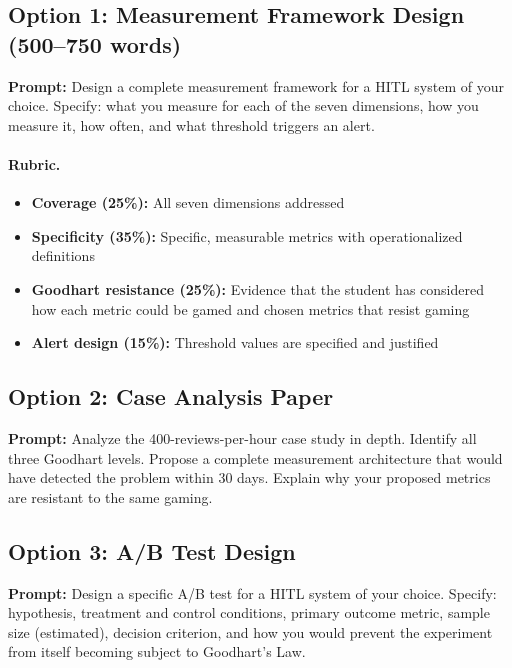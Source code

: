 \subsection{Option 1: Measurement Framework Design (500--750 words)}

\textbf{Prompt:} Design a complete measurement framework for a HITL system of your choice. Specify: what you measure for each of the seven dimensions, how you measure it, how often, and what threshold triggers an alert.

\paragraph{Rubric.}
\begin{itemize}
    \item \textbf{Coverage (25\%):} All seven dimensions addressed
    \item \textbf{Specificity (35\%):} Specific, measurable metrics with operationalized definitions
    \item \textbf{Goodhart resistance (25\%):} Evidence that the student has considered how each metric could be gamed and chosen metrics that resist gaming
    \item \textbf{Alert design (15\%):} Threshold values are specified and justified
\end{itemize}

\subsection{Option 2: Case Analysis Paper}

\textbf{Prompt:} Analyze the 400-reviews-per-hour case study in depth. Identify all three Goodhart levels. Propose a complete measurement architecture that would have detected the problem within 30 days. Explain why your proposed metrics are resistant to the same gaming.

\subsection{Option 3: A/B Test Design}

\textbf{Prompt:} Design a specific A/B test for a HITL system of your choice. Specify: hypothesis, treatment and control conditions, primary outcome metric, sample size (estimated), decision criterion, and how you would prevent the experiment from itself becoming subject to Goodhart's Law.


